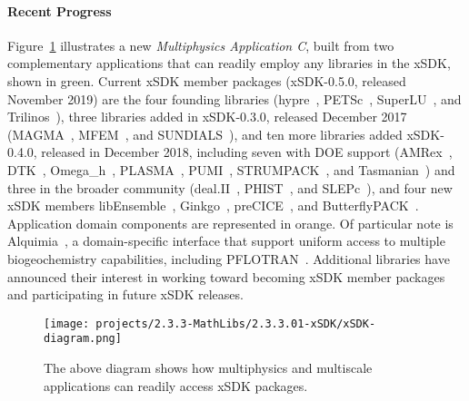 \paragraph{Recent Progress}

Figure~\ref{fig:xsdk-schematic} illustrates a new {\em Multiphysics
	Application C}, built from two complementary applications that can
readily employ any libraries in the xSDK, shown in green.  Current xSDK member packages (xSDK-0.5.0, released November 2019) are the four founding libraries
(hypre~\cite{hypre:homepage}, PETSc~\cite{petsc:homepage}, SuperLU~\cite{superlu:homepage}, and Trilinos~\cite{trilinos:homepage}), three libraries added in xSDK-0.3.0, released December 2017 (MAGMA~\cite{magma:homepage}, MFEM~\cite{mfem:homepage}, and SUNDIALS~\cite{sundials:homepage}), and ten more libraries added xSDK-0.4.0, released in December 2018, including seven with DOE support (AMRex~\cite{amrex:homepage}, DTK~\cite{dtk:homepage}, Omega\_h~\cite{omega_h:homepage}, PLASMA~\cite{plasma:homepage}, PUMI~\cite{pumi:homepage}, STRUMPACK~\cite{strumpack:homepage}, and Tasmanian~\cite{tasmanian:homepage}) and three in the broader community (deal.II~\cite{deal.ii:homepage}, PHIST~\cite{phist:homepage}, and SLEPc~\cite{slepc:homepage}), and four new xSDK members libEnsemble~\cite{libensemble:homepage}, Ginkgo~\cite{ginkgo:homepage}, preCICE~\cite{precice:homepage}, and ButterflyPACK~\cite{butterflypack:homepage}.
Application domain components are represented
in orange.  Of particular note is Alquimia~\cite{alquimia:homepage}, a domain-specific interface
that support uniform access to multiple biogeochemistry capabilities, including
PFLOTRAN~\cite{pflotran:homepage}.  Additional libraries have announced their interest in working toward becoming xSDK member packages and participating in future xSDK releases.
\begin{figure}[htb]
	\centering
	\texttt{[image: projects/2.3.3-MathLibs/2.3.3.01-xSDK/xSDK-diagram.png]}
	\caption{\label{fig:xsdk-schematic} The above diagram shows how multiphysics and multiscale applications can readily access xSDK packages.}
\end{figure}

